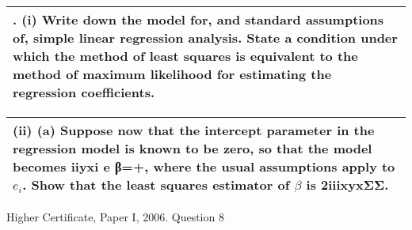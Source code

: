 \documentclass[a4paper,12pt]{article}
\begin{document}

\begin{table}[ht!]
     
\centering
     
\begin{tabular}{|p{15cm}|}
     
\hline        

\noindent
8. (i) Write down the model for, and standard assumptions of, simple linear regression analysis. 
State a condition under which the method of least squares is equivalent to the method of maximum likelihood for estimating the regression coefficients.
\\ \hline
      
\end{tabular}
    
\end{table}



\begin{table}[ht!]
     
\centering
     
\begin{tabular}{|p{15cm}|}
     
\hline        

\noindent

(ii) (a) Suppose now that the intercept parameter in the regression model is known to be zero, so that the model becomes
iiyxi e β=+,
where the usual assumptions apply to $e_i$. Show that the least squares estimator of $\beta$ is 2iiixyxΣΣ.
\\ \hline
      
\end{tabular}
    
\end{table}





Higher Certificate, Paper I, 2006. Question 8
\end{document}
